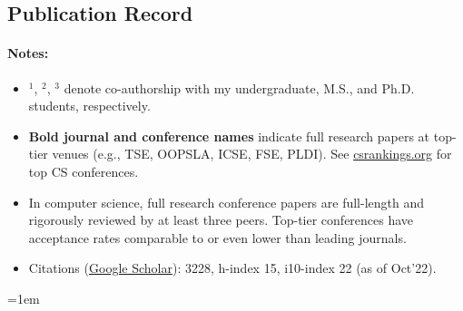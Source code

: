 \documentclass[11pt]{article}
\newcommand{\coe}[1]{\iftoggle{usecoe}{#1}{}}
\newcommand{\mygooglescholar}{\href{https://scholar.google.com/citations?user=TLcVQ-MAAAAJ}{Google Scholar}}
\newcommand{\mypubcc}[1]{\item~\label{#1} \fullcite{\detokenize{#1}c}}
\begin{document}
\subsection{Publication Record}

\paragraph{Notes:}
\begin{itemize}
\item \(^1\), \(^2\), \(^3\) denote co-authorship with my undergraduate, M.S., and Ph.D. students, respectively.
\item  \textbf{Bold journal and conference names} indicate full research papers at top-tier venues (e.g., TSE, OOPSLA, ICSE, FSE, PLDI). See \href{https://csrankings.org}{csrankings.org} for top CS conferences.
\item In computer science, full research conference papers are full-length and rigorously reviewed by at least three peers. Top-tier conferences have acceptance rates comparable to or even lower than leading journals.
\item Citations (\mygooglescholar{}): 3228, h-index 15, i10-index 22 (as of Oct'22).  
\end{itemize}

\emergencystretch=1em
\newcommand{\mybooks}{
  \begin{enumerate}
    \mypubcc{kapur2013geometric}
  \end{enumerate}
}

\newcommand{\myjournals}{
  \begin{enumerate}[label=J\arabic*]
    
    \mypubcc{nguyen2021using}
    \coe{\mypubcc{ishimwe2021dynaplex}}
    \coe{\mypubcc{le2020dynamite}}

    \coe{\mypubcc{mariano2019program}}

    \mypubcc{nguyen2014dig}

    \mypubcc{le2011genprog}
    \begin{itemize}
    \item \textbf{Featured Article}
    \item \textbf{1000+ citations}
    \end{itemize}
    
    \mypubcc{weimer2010automatic}
    \begin{itemize}
    \item \textbf{Research Highlight}
    \item \textbf{400+ citations}
    \end{itemize}
    
    \mypubcc{bui2008ant}
    \begin{itemize}
    \item \textbf{100+ citations}
    \end{itemize}
    
    \mypubcc{smith2007autonomous}
    
  \end{enumerate}
}
\end{document}
